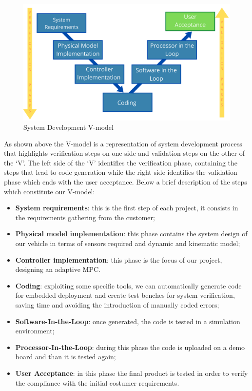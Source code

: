\begin{figure}[H]
    \centering
    \includegraphics[width=1\textwidth]{Figures/V-MODEL.png}
    \caption{System Development V-model}
    
    \label{fig:V_model}
\end{figure}

As shown above the V-model is a representation of system development process that highlights verification steps on one side and validation steps on the other of the ‘V’. The left side of the ‘V’ identifies the verification phase, containing the steps that lead to code generation while the right side identifies the validation phase which ends with the user acceptance.
Below a brief description of the steps which constitute our V-model:
\begin{itemize}
    \item \textbf{System requirements}: this is the first step of each project, it consists in the requirements gathering from the customer;
    \item \textbf{Physical model implementation}: this phase contains the system design of our vehicle in terms of sensors required and dynamic and kinematic model;
    \item \textbf{Controller implementation}: this phase is the focus of our project, designing an adaptive MPC. 
    \item \textbf{Coding}: exploiting some specific tools, we can automatically generate code for embedded deployment and create test benches for system verification, saving time and avoiding the introduction of manually coded errors;
    \item \textbf{Software-In-the-Loop}: once generated, the code is tested in a simulation environment;
    
    \item \textbf{Processor-In-the-Loop}: during this phase the code is uploaded on a demo board and than it is tested again;
    
    \item \textbf{User Acceptance}: in this phase the final product is tested in order to verify the compliance with the initial costumer requirements.
\end{itemize}

